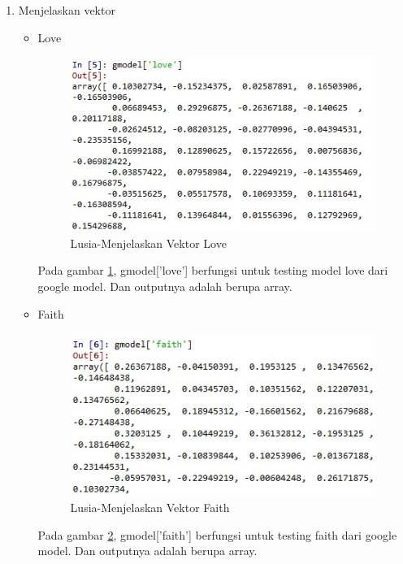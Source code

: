 \begin{enumerate}
\begin{enumerate}
		\item Menjelaskan vektor
			\begin{itemize}
				\item Love
					\begin{figure}[!hbtp]
					\centering
					\includegraphics[scale=0.45]{figures/chap5a.jpg}
					\caption{Lusia-Menjelaskan Vektor Love}
					\label{5b2}
					\end{figure}
					\par Pada gambar \ref{5b2}, gmodel['love'] berfungsi untuk testing model love dari google model. Dan outputnya adalah berupa array. 
					
				\item Faith
					\begin{figure}[!hbtp]
					\centering
					\includegraphics[scale=0.45]{figures/chap5b.jpg}
					\caption{Lusia-Menjelaskan Vektor Faith}
					\label{5b3}
					\end{figure}
					\par Pada gambar \ref{5b3}, gmodel['faith'] berfungsi untuk testing faith dari google model. Dan outputnya adalah berupa array. 
					

\end{itemize}
\end{enumerate}
\end{enumerate}
